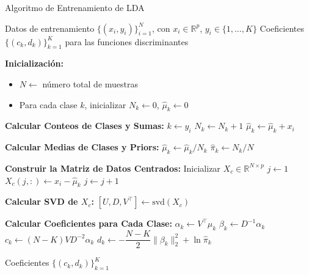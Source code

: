 \begin{algorithm}[htbp]
\caption{Algoritmo de Entrenamiento de LDA} \label{alg:lda-training}
\begin{algorithmic}[1]
\REQUIRE Datos de entrenamiento $\{(x_i, y_i)\}_{i=1}^N$, con $x_i \in \mathbb{R}^p$, $y_i \in \{1,\ldots,K\}$
\ENSURE Coeficientes $\{ (c_k, d_k) \}_{k=1}^K$ para las funciones discriminantes

\STATE \textbf{Inicialización:}
\begin{itemize}
    \item $N \gets$ número total de muestras
    \item Para cada clase $k$, inicializar $N_k \gets 0$, $\hat{\mu}_k \gets 0$
\end{itemize}

\STATE \textbf{Calcular Conteos de Clases y Sumas:}
    \STATE $k \gets y_i$
    \STATE $N_k \gets N_k + 1$
    \STATE $\hat{\mu}_k \gets \hat{\mu}_k + x_i$
\ENDFOR

\STATE \textbf{Calcular Medias de Clases y Priors:}
    \STATE $\hat{\mu}_k \gets \hat{\mu}_k / N_k$
    \STATE $\hat{\pi}_k \gets N_k / N$
\ENDFOR

\STATE \textbf{Construir la Matriz de Datos Centrados:}
\STATE Inicializar $X_c \in \mathbb{R}^{N \times p}$
\STATE $j \gets 1$
        \STATE $X_c(j, :) \gets x_i - \hat{\mu}_k$
        \STATE $j \gets j + 1$
    \ENDFOR
\ENDFOR

\STATE \textbf{Calcular SVD de $X_c$:}
\STATE $[U, D, V^\top] \gets \text{svd}(X_c)$

\STATE \textbf{Calcular Coeficientes para Cada Clase:}
    \STATE $\alpha_k \gets V^\top \hat{\mu}_k$
    \STATE $\beta_k \gets D^{-1} \alpha_k$
    \STATE $c_k \gets (N - K) V D^{-2} \alpha_k$
    \STATE $d_k \gets -\dfrac{N - K}{2} \| \beta_k \|_2^2 + \ln \hat{\pi}_k$
\ENDFOR

\RETURN Coeficientes $\{ (c_k, d_k) \}_{k=1}^K$
\end{algorithmic}
\end{algorithm}
